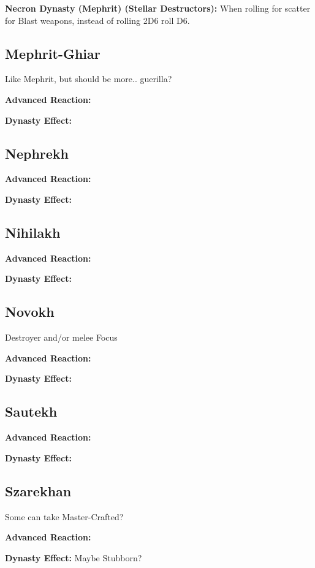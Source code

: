 \textbf{Necron Dynasty (Mephrit) (Stellar Destructors):} When rolling for scatter for Blast weapons, instead of rolling 2D6 roll D6.




\subsection{Mephrit-Ghiar}

Like Mephrit, but should be more.. guerilla?

\textbf{Advanced Reaction:}

\textbf{Dynasty Effect:}


\subsection{Nephrekh}

\textbf{Advanced Reaction:}

\textbf{Dynasty Effect:}


\subsection{Nihilakh}

\textbf{Advanced Reaction:}

\textbf{Dynasty Effect:}


\subsection{Novokh}

Destroyer and/or melee Focus

\textbf{Advanced Reaction:}

\textbf{Dynasty Effect:}

\subsection{Sautekh}

\textbf{Advanced Reaction:}

\textbf{Dynasty Effect:}


\subsection{Szarekhan}

Some can take Master-Crafted?

\textbf{Advanced Reaction:}

\textbf{Dynasty Effect:} Maybe Stubborn?


